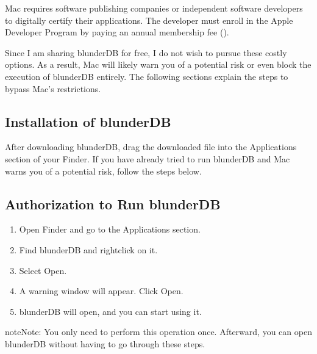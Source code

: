 \documentclass[letterpaper,10pt,english]{sphinxmanual}
\begin{document}
\sphinxAtStartPar
Mac requires software publishing companies or independent software developers to digitally certify their applications. The developer must enroll in the Apple Developer Program by paying an annual membership fee ().

\sphinxAtStartPar
Since I am sharing blunderDB for free, I do not wish to pursue these costly options. As a result, Mac will likely warn you of a potential risk or even block the execution of blunderDB entirely. The following sections explain the steps to bypass Mac’s restrictions.


\subsection{Installation of blunderDB}
\label{\detokenize{annexe_mac_securite:installation-de-blunderdb}}
\sphinxAtStartPar
After downloading blunderDB, drag the downloaded file into the Applications section of your Finder. If you have already tried to run blunderDB and Mac warns you of a potential risk, follow the steps below.


\subsection{Authorization to Run blunderDB}
\label{\detokenize{annexe_mac_securite:autorisation-de-l-execution-de-blunderdb}}\begin{enumerate}
%
\item {} 
\sphinxAtStartPar
Open Finder and go to the Applications section.

\item {} 
\sphinxAtStartPar
Find blunderDB and right\sphinxhyphen{}click on it.

\item {} 
\sphinxAtStartPar
Select Open.

\item {} 
\sphinxAtStartPar
A warning window will appear. Click Open.

\item {} 
\sphinxAtStartPar
blunderDB will open, and you can start using it.

\end{enumerate}

\begin{sphinxadmonition}{note}{Note:}
\sphinxAtStartPar
You only need to perform this operation once. Afterward, you can open blunderDB without having to go through these steps.
\end{sphinxadmonition}
\end{document}

